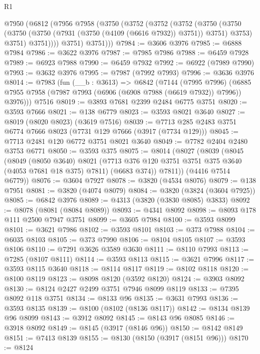 \begin{lexlean}{R1}
\begin{coremodule}
    @7950
      (@6812
        (@7956
          @7958
          (@3750
            (@3752
              (@3752
                (@3752
                  (@3750
                    (@3750
                      (@3750 (@3750 (@7931 (@3750 (@4109 (@6616 @7932)) @3751)) @3751) @3753)
                      @3751)
                    @3751))))
            @3751)
          @3751)))
@7984 := @3606 @3976
@7985 := @6888 @7984
@7986 := @3622 @3976
@7987 := @7985 @7986
@7988 := @6459 @7928
@7989 := @6923 @7988
@7990 := @6459 @7932
@7992 := @6922 (@7989 @7990)
@7993 := @3632 @3976
@7995 := @7987 (@7992 @7993)
@7996 := @3636 @3976
@8014 := @7983
    (fun (__b : @3613) =>
    @6842
      (@7144
        (@7995 @7996)
        (@6885 @7955 @7958 (@7987 @7993 (@6906 (@6908 @7988 (@6619 @7932)) @7996)) @3976)))
    @7516
@8019 := @3893 @7681 @2399 @2484 @6775 @3751
@8020 := @3593 @7666
@8021 := @138 @6779
@8023 := @3593 @8021 @3640
@8027 := @8019 (@8020 @8023) (@3619 @7516)
@8039 := @7713 @285 @2483 @3751 @6774 @7666 @8023 (@7731 @129 @7666 (@3917 (@7734 @129)))
@8045 := @7713 @2481 @120 @6772 @3751 @8021 @3640
@8049 := @7782 @2404 @2480 @3753 @6771
@8050 := @3593 @375
@8075 := @8014
    (@8027
      (@8039
        (@8045
          (@8049
            (@8050 @3640)
            @8021
            (@7713 @376 @120 @3751 @3751 @375 @3640 (@4053 @7681 @18 @375) @7811)
            (@6683 @374))
          @7811))
      (@4416 @7514 @6779))
@8076 := @3604 @7927
@8078 := @3820 (@4534 @8076)
@8079 := @138 @7951
@8081 := @3820 (@4074 @8079)
@8084 := @3820 (@3824 (@3604 @7925))
@8085 := @6842 @3976
@8089 := @4313 (@3820 (@3830 @8085) @3833)
@8092 := @8078 (@8081 (@8084 @8089))
@8093 := @4341 @8092
@8098 := @8093 @178 @111 @2500 @7947 @3751
@8099 := @3605 @7984
@8100 := @3593 @8099
@8101 := @3621 @7986
@8102 := @3593 @8101
@8103 := @373 @7988
@8104 := @6035 @8103
@8105 := @373 @7990
@8106 := @8104 @8105
@8107 := @3593 @8106
@8110 := @7291 @3626 @3589 @3630
@8111 := @8110 @7993
@8113 := @7285 (@8107 @8111)
@8114 := @3593 @8113
@8115 := @3621 @7996
@8117 := @3593 @8115 @3640
@8118 := @8114 @8117
@8119 := @8102 @8118
@8120 := @8100 @8119
@8123 := @8098 @8120 (@3592 @8120)
@8124 := @3903 @8092
@8130 := @8124 @2427 @2499 @3751 @7946 @8099 @8119
@8133 := @7395 @8092 @118 @3751
@8134 := @8133 @96
@8135 := @3631 @7993
@8136 := @3593 @8135
@8139 := @8100 (@8102 (@8136 @8117))
@8142 := @8134 @8139 @96 @8099
@8143 := @3912 @8092
@8145 := @8143 @96 @8085
@8146 := @3918 @8092
@8149 := @8145 (@3917 (@8146 @96))
@8150 := @8142 @8149
@8151 := @7413 @8139
@8155 := @8130 (@8150 (@3917 (@8151 @96)))
@8170 := @8124

\end{coremodule}
\end{lexlean}
